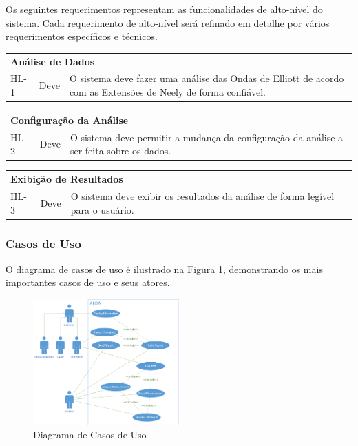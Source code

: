 \documentclass[12pt]{article}
\begin{document}
Os seguintes requerimentos representam as funcionalidades de alto-nível do sistema.
Cada requerimento de alto-nível será refinado em detalhe por vários requerimentos específicos
e técnicos.

\begingroup
\renewcommand*{\arraystretch}{1.5}
\begin{tabular}{|p{1cm} p{1cm} p{9cm}|}
	\hline
	\multicolumn{3}{|l|}{\textbf{Análise de Dados}}\\
	HL-1 & Deve &	O sistema deve fazer uma análise das Ondas de Elliott de acordo com as
					Extensões de Neely de forma confiável.\\
	\hline
\end{tabular}

\begin{tabular}{|p{1cm} p{1cm} p{9cm}|}
	\hline
	\multicolumn{3}{|l|}{\textbf{Configuração da Análise}}\\
	HL-2 & Deve &	O sistema deve permitir a mudança da configuração da análise a ser
					feita sobre os dados.\\
	\hline
\end{tabular}

\begin{tabular}{|p{1cm} p{1cm} p{9cm}|}
	\hline
	\multicolumn{3}{|l|}{\textbf{Exibição de Resultados}}\\
	HL-3 & Deve &	O sistema deve exibir os resultados da análise de forma legível para
					o usuário.\\
	\hline
\end{tabular}
\endgroup

\subsubsection{Casos de Uso}

O diagrama de casos de uso é ilustrado na Figura \ref{fig:uc_diagram}, demonstrando os mais
importantes casos de uso e seus atores.

\begin{figure}[H]
	\centering
	\includegraphics[width=0.5\textwidth]{uc_diagram.png}
	\caption{Diagrama de Casos de Uso}\label{fig:uc_diagram}
\end{figure}
\end{document}
